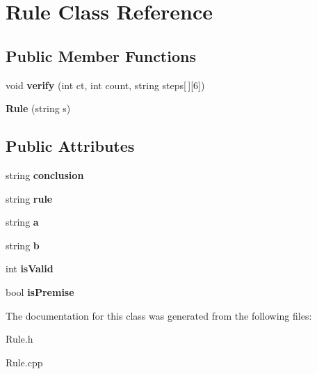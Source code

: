 \hypertarget{classRule}{}\section{Rule Class Reference}
\label{classRule}
\subsection*{Public Member Functions}
\begin{DoxyCompactItemize}
\item 
\mbox{\label{classRule_a0d613a9c085dc7dc5d0889f44d7580c8}} 
void {\bfseries verify} (int ct, int count, string steps\mbox{[}$\,$\mbox{]}\mbox{[}6\mbox{]})
\item 
\mbox{\label{classRule_a401fed708ec31885b0f7725563ece2db}} 
{\bfseries Rule} (string s)
\end{DoxyCompactItemize}
\subsection*{Public Attributes}
\begin{DoxyCompactItemize}
\item 
\mbox{\label{classRule_adcd989a3fb8a2df12e07f5a4be66dcb7}} 
string {\bfseries conclusion}
\item 
\mbox{\label{classRule_a4a3c8939147eafb71833de7e7799425a}} 
string {\bfseries rule}
\item 
\mbox{\label{classRule_a4e850c1d222d5108e71c1a6ad22fed0e}} 
string {\bfseries a}
\item 
\mbox{\label{classRule_a6ae002fe7e9bb3db773ac3b0432ec7c4}} 
string {\bfseries b}
\item 
\mbox{\label{classRule_ab2c2c61a07fee883bd3490579f0dea61}} 
int {\bfseries is\+Valid}
\item 
\mbox{\label{classRule_aa0bfccc966deca42d4654b07d01b3c0c}} 
bool {\bfseries is\+Premise}
\end{DoxyCompactItemize}


The documentation for this class was generated from the following files\+:\begin{DoxyCompactItemize}
\item 
Rule.\+h\item 
Rule.\+cpp\end{DoxyCompactItemize}

